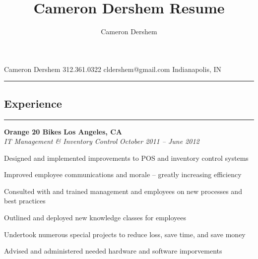 \documentclass[10pt,letterpaper]{article}			%
\author{Cameron Dershem}							%
\title{Cameron Dershem Resume}						%
\newcommand{\Location}{Indianapolis, IN}			%
\newcommand{\JobHeader}[4]{							%
			\textbf{#1}
			\hfill
			\textbf{#2}
			\\
			\emph{#3}
			\hfill
			\emph{#4}\par}
\begin{document}

{\Huge Cameron Dershem}
\hfill 312.361.0322
\hfill cldershem@gmail.com
\hfill \Location
\vspace{.2em}
\hrule



\vspace{-.8em}
\subsection*{Experience}
\vspace{-.6em}
\hrule
\vspace{0.8em}

\JobHeader{Orange 20 Bikes}{Los Angeles, CA}{IT Management \& Inventory Control}{October 2011 -- June 2012}
	\begin{itemize*}	
	\item Designed and implemented improvements to POS and inventory control systems
	\item Improved employee communications and morale -- greatly increasing efficiency
	\item Consulted with and trained management and employees on new processes and best practices
	\item Outlined and deployed new knowledge classes for employees 
	\item Undertook numerous special projects to reduce loss, save time, and save money
	\item Advised and administered needed hardware and software imporvements
	\end{itemize*}
	
\end{document}
